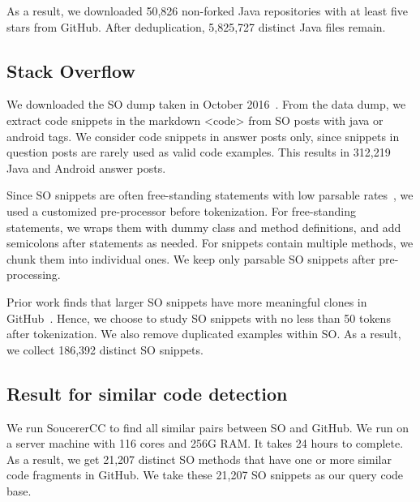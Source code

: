 As a result, we downloaded 50,826 non-forked Java repositories with at least five stars from GitHub. After deduplication, 5,825,727 distinct Java files remain.


\subsection{Stack Overflow}
We downloaded the SO dump taken in October 2016~\cite{stackexchange}. From the data dump, we extract code snippets in the markdown {\ttt <code>} from SO posts with {\ttt java} or {\ttt android} tags.
We consider code snippets in answer posts only, since snippets in question posts are rarely used as valid code examples. This results in 312,219 Java and Android answer posts.

Since SO snippets are often free-standing statements with low parsable rates~\cite{yang2016query}, we used a customized pre-processor before tokenization. For free-standing statements, we wraps them with dummy class and method definitions, and add semicolons after statements as needed. For snippets contain multiple methods, we chunk them into individual ones. We keep only parsable SO snippets after pre-processing.

Prior work finds that larger SO snippets have more meaningful clones in GitHub~\cite{yang2017stack}. Hence, we choose to study SO snippets with no less than 50 tokens after tokenization. We also remove duplicated examples within SO. As a result, we collect 186,392 distinct SO snippets.

\subsection{Result for similar code detection}
We run SoucererCC to find all similar pairs between SO and GitHub. We run on a server machine with 116 cores and 256G RAM. It takes 24 hours to complete. As a result, we get 21,207 distinct SO methods that have one or more similar code fragments in GitHub. We take these 21,207 SO snippets as our query code base.